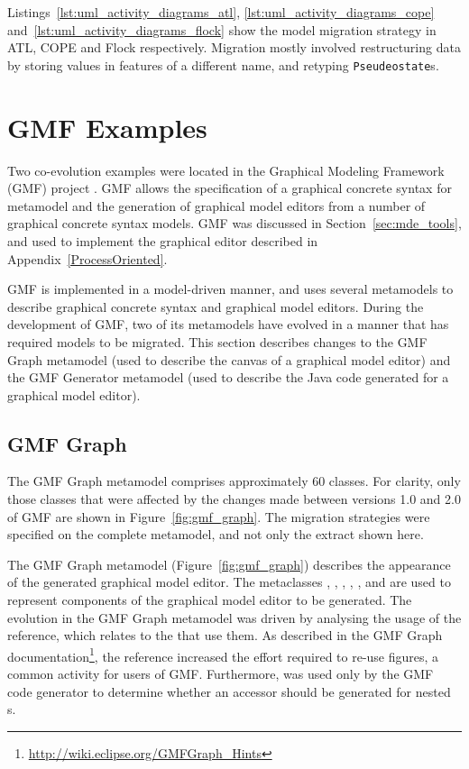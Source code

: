 Listings~\ref{lst:uml_activity_diagrams_atl}, \ref{lst:uml_activity_diagrams_cope} and~\ref{lst:uml_activity_diagrams_flock} show the model migration strategy in ATL, COPE and Flock respectively. Migration mostly involved restructuring data by storing values in features of a different name, and retyping \texttt{Pseudeostate}s.




\section{GMF Examples}
Two co-evolution examples were located in the Graphical Modeling Framework (GMF) project \cite{gronback09emp}. GMF allows the specification of a graphical concrete syntax for metamodel and the generation of graphical model editors from a number of graphical concrete syntax models. GMF was discussed in Section~\ref{sec:mde_tools}, and used to implement the graphical editor described in Appendix~\ref{ProcessOriented}.

GMF is implemented in a model-driven manner, and uses several metamodels to describe graphical concrete syntax and graphical model editors. During the development of GMF, two of its metamodels have evolved in a manner that has required models to be migrated. This section describes changes to the GMF Graph metamodel (used to describe the canvas of a graphical model editor) and the GMF Generator metamodel (used to describe the Java code generated for a graphical model editor).

\subsection{GMF Graph}
\label{subsec:gmf_graph}
The GMF Graph metamodel comprises approximately 60 classes. For clarity, only those classes that were affected by the changes made between versions 1.0 and 2.0 of GMF are shown in Figure~\ref{fig:gmf_graph}. The migration strategies were specified on the complete metamodel, and not only the extract shown here.

The GMF Graph metamodel (Figure~\ref{fig:gmf_graph}) describes the appearance of the generated graphical model editor. The metaclasses , , , , , and  are used to represent components of the graphical model editor to be generated. The evolution in the GMF Graph metamodel was driven by analysing the usage of the  reference, which relates  to the  that use them. As described in the GMF Graph documentation\footnote{\url{http://wiki.eclipse.org/GMFGraph_Hints}}, the  reference increased the effort required to re-use figures, a common activity for users of GMF. Furthermore,  was used only by the GMF code generator to determine whether an accessor
should be generated for nested s.

